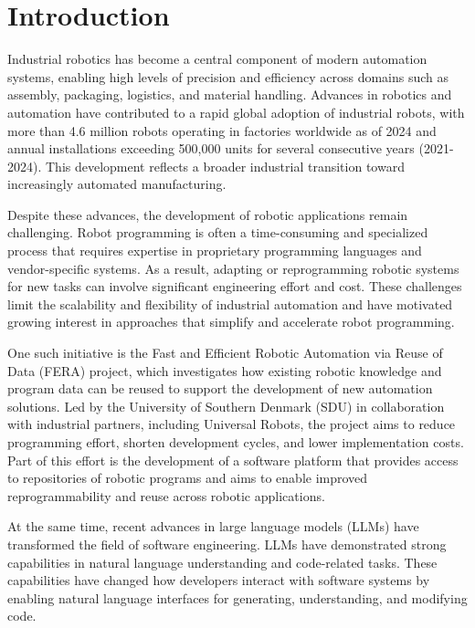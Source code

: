 \chapter{Introduction} \label{chapter:introduction}
Industrial robotics has become a central component of modern automation systems, enabling high levels of precision and efficiency across domains such as assembly, packaging, logistics, and material handling. Advances in robotics and automation have contributed to a rapid global adoption of industrial robots, with more than 4.6 million robots operating in factories worldwide as of 2024 and annual installations exceeding 500,000 units for several consecutive years (2021-2024). \cite{IFR2025} This development reflects a broader industrial transition toward increasingly automated manufacturing.

Despite these advances, the development of robotic applications remain challenging. Robot programming is often a time-consuming and specialized process that requires expertise in proprietary programming languages and vendor-specific systems. As a result, adapting or reprogramming robotic systems for new tasks can involve significant engineering effort and cost. These challenges limit the scalability and flexibility of industrial automation and have motivated growing interest in approaches that simplify and accelerate robot programming. \cite{FERA2024}

One such initiative is the Fast and Efficient Robotic Automation via Reuse of Data (FERA) project, which investigates how existing robotic knowledge and program data can be reused to support the development of new automation solutions. \cite{FERA2024} Led by the University of Southern Denmark (SDU) in collaboration with industrial partners, including Universal Robots, the project aims to reduce programming effort, shorten development cycles, and lower implementation costs. Part of this effort is the development of a software platform that provides access to repositories of robotic programs and aims to enable improved reprogrammability and reuse across robotic applications.

At the same time, recent advances in large language models (LLMs) have transformed the field of software engineering. LLMs have demonstrated strong capabilities in natural language understanding and code-related tasks. \cite{chen2021evaluating, austin2021program} These capabilities have changed how developers interact with software systems by enabling natural language interfaces for generating, understanding, and modifying code.

